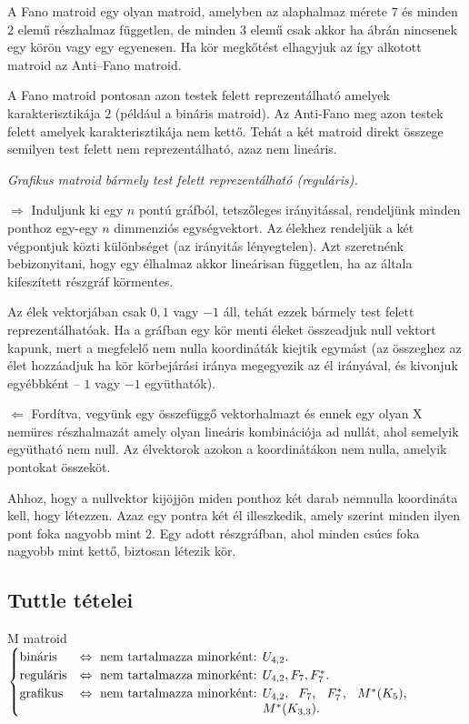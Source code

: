 A Fano matroid egy olyan matroid, amelyben az alaphalmaz mérete $7$ és minden
$2$ elemű részhalmaz független, de minden $3$ elemű csak akkor ha
 ábrán nincsenek egy körön vagy egy egyenesen. Ha kör megkőtést
elhagyjuk az így alkotott matroid az Anti--Fano matroid.

A Fano matroid pontosan azon testek felett reprezentálható amelyek
karakterisztikája $2$ (például a bináris matroid). Az Anti-Fano meg azon testek
felett amelyek karakterisztikája nem kettő. Tehát a két matroid direkt összege
semilyen test felett nem reprezentálható, azaz nem lineáris.

\vspace{0.4cm}
\emph{Grafikus matroid bármely test felett reprezentálható (reguláris).}
\vspace{0.4cm}

$\Rightarrow$ Induljunk ki egy $n$ pontú gráfból, tetszőleges irányitással,
rendeljünk minden ponthoz egy-egy $n$ dimmenziós egységvektort. Az élekhez
rendeljük a két végpontjuk közti különbséget (az irányitás lényegtelen). Azt
szeretnénk bebizonyitani, hogy egy élhalmaz akkor lineárisan független, ha az
általa kifeszített részgráf körmentes.

Az élek vektorjában csak $0,1$ vagy $-1$ áll, tehát ezzek bármely test felett
reprezentálhatóak. Ha a gráfban egy kör menti éleket összeadjuk null vektort
kapunk, mert a megfelelő nem nulla koordináták kiejtik egymást (az összeghez az
élet hozzáadjuk ha kör körbejárási iránya megegyezik az él irányával, és
kivonjuk egyébbként -- $1$ vagy $-1$ együthatók).

$\Leftarrow$ Fordítva, vegyünk egy összefüggő vektorhalmazt és ennek egy olyan X
nemüres részhalmazát amely olyan lineáris kombinációja ad nullát, ahol semelyik
együtható nem null. Az élvektorok azokon a koordinátákon nem nulla, amelyik
pontokat összeköt. 

Ahhoz, hogy a nullvektor kijöjjön miden ponthoz két darab nemnulla koordináta
kell, hogy létezzen. Azaz egy pontra két él illeszkedik, amely szerint minden
ilyen pont foka nagyobb mint $2$.  Egy adott részgráfban, ahol minden csúcs foka
nagyobb mint kettő, biztosan létezik kör.

\subsection{Tuttle tételei}

M matroid $\begin{cases}
\mbox{bináris} &\Leftrightarrow \mbox{ nem tartalmazza minorként: } U_{4,2}. \\ 
\mbox{reguláris} &\Leftrightarrow \mbox{ nem tartalmazza minorként: } U_{4,2}, F_7, F_7^*. \\
\mbox{grafikus} &\Leftrightarrow \mbox{ nem tartalmazza minorként: } \parbox[t]{4cm}{
$U_{4,2},$ $F_7$, $F_7^*$, $M^*(K_5)$, $M^*(K_{3,3})$.} \\
\end{cases}$

